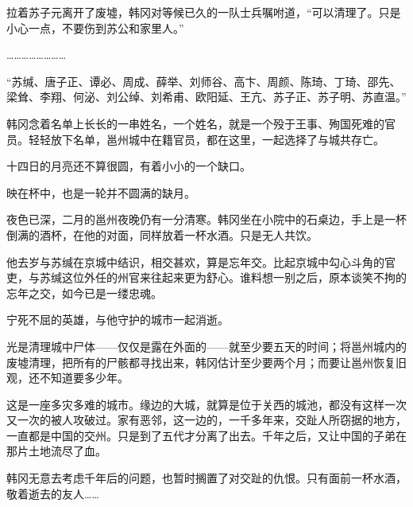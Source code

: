 拉着苏子元离开了废墟，韩冈对等候已久的一队士兵嘱咐道，“可以清理了。只是小心一点，不要伤到苏公和家里人。”

……………………

“苏缄、唐子正、谭必、周成、薛举、刘师谷、高卞、周颜、陈琦、丁琦、邵先、梁耸、李翔、何泌、刘公绰、刘希甫、欧阳延、王亢、苏子正、苏子明、苏直温。”

韩冈念着名单上长长的一串姓名，一个姓名，就是一个殁于王事、殉国死难的官员。轻轻放下名单，邕州城中在籍官员，都在这里，一起选择了与城共存亡。

十四日的月亮还不算很圆，有着小小的一个缺口。

映在杯中，也是一轮并不圆满的缺月。

夜色已深，二月的邕州夜晚仍有一分清寒。韩冈坐在小院中的石桌边，手上是一杯倒满的酒杯，在他的对面，同样放着一杯水酒。只是无人共饮。

他去岁与苏缄在京城中结识，相交甚欢，算是忘年交。比起京城中勾心斗角的官吏，与苏缄这位外任的州官来往起来更为舒心。谁料想一别之后，原本谈笑不拘的忘年之交，如今已是一缕忠魂。

宁死不屈的英雄，与他守护的城市一起消逝。

光是清理城中尸体——仅仅是露在外面的——就至少要五天的时间；将邕州城内的废墟清理，把所有的尸骸都寻找出来，韩冈估计至少要两个月；而要让邕州恢复旧观，还不知道要多少年。

这是一座多灾多难的城市。缘边的大城，就算是位于关西的城池，都没有这样一次又一次的被人攻破过。家有恶邻，这一边的，一千多年来，交趾人所窃据的地方，一直都是中国的交州。只是到了五代才分离了出去。千年之后，又让中国的子弟在那片土地流尽了血。

韩冈无意去考虑千年后的问题，也暂时搁置了对交趾的仇恨。只有面前一杯水酒，敬着逝去的友人……

